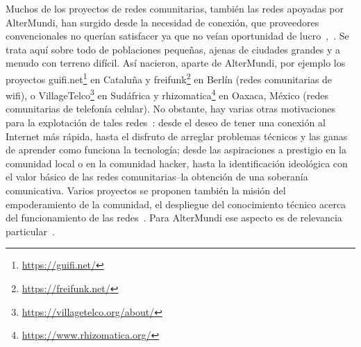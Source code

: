 \begin{comment}
características:
* infraestructura de comunicación descentralizada, creada y mantenida por la comunidad de lxs usuarixs (el estado/empresas grandes no pueden cerrarla tan facilmente) --> interesante sobre todo también para contextos autócratos (regimenes políticos antidemocráticos, vease Iran, China, Cuba, .. )
* garantizar acceso libre a información
* garantizar la libertad de expresión
* ..
* el firmware: software libre

\item infraestructura de comunicación abierta, accesible para tod@s
\item infraestructura creada y mantenida por la comunidad de l@s usuari@s

  \begin{itemize}
    \item conectar a comunidades excluidas por los proveedores convencionales de servicios Internet
    \item garantizar acceso libre a información
    \item garantizar la libertad de expreción
  \end{itemize}
\end{comment}

Muchos de los proyectos de redes comunitarias, también las redes apoyadas por AlterMundi, han surgido desde la necesidad de conexión, que proveedores convencionales no querían satisfacer ya que no veían oportunidad de lucro~\autocite{Piccoli2015},~\autocite{Vaseva2016a}.
Se trata aquí sobre todo de poblaciones pequeñas, ajenas de ciudades grandes y a menudo con terreno difícil.
Así nacieron, aparte de AlterMundi, por ejemplo los proyectos guifi.net\footnote{\url{https://guifi.net/}} en Cataluña y freifunk\footnote{\url{https://freifunk.net/}} en Berlín (redes comunitarias de wifi), o VillageTelco\footnote{\url{https://villagetelco.org/about/}} en Sudáfrica y rhizomatica\footnote{\url{https://www.rhizomatica.org/}} en Oaxaca, México (redes comunitarias de telefonía celular).
No obstante, hay varias otras motivaciones para la explotación de tales redes~\autocite{Vaseva2016b}:
desde el deseo de tener una conexión al Internet más rápida, hasta el disfruto de arreglar problemas técnicos y las ganas de aprender como funciona la tecnología;
desde las aspiraciones a prestigio en la comunidad local o en la comunidad hacker, hasta la identificación ideológica con el valor básico de las redes comunitarias--la obtención de una soberanía comunicativa.
Varios proyectos se proponen también la misión del empoderamiento de la comunidad, el despliegue del conocimiento técnico acerca del funcionamiento de las redes~\autocite{Vaseva2016b}.
Para AlterMundi ese aspecto es de relevancia particular~\autocite{Vaseva2016a}.

